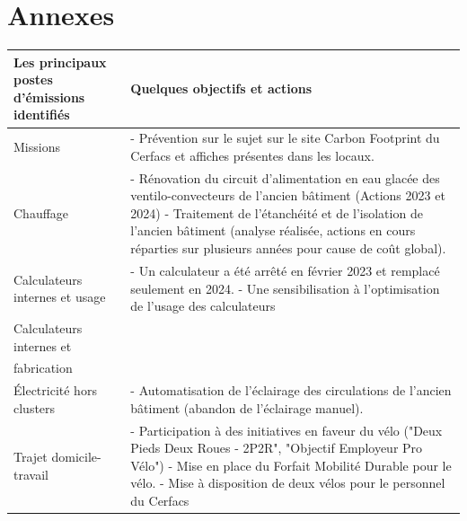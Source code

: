 \section*{Annexes}





\begin{table}[ht]
    \centering
    \begin{tabular}{|p{}|p{}|}
    \hline
    \textbf{Les principaux postes d’émissions identifiés} & \textbf{Quelques objectifs et actions} \\
    \hline
    Missions & 
    - Prévention sur le sujet sur le site Carbon Footprint du Cerfacs et affiches présentes dans les locaux. \\
    \hline
    Chauffage & 
    - Rénovation du circuit d’alimentation en eau glacée des ventilo-convecteurs de l’ancien bâtiment (Actions 2023 et 2024) \newline
    - Traitement de l’étanchéité et de l’isolation de l’ancien bâtiment (analyse réalisée, actions en cours réparties sur plusieurs années pour cause de coût global). \\
    \hline
    Calculateurs internes et usage & 
    - Un calculateur a été arrêté en février 2023 et remplacé seulement en 2024. \newline
    - Une sensibilisation à l’optimisation de l’usage des calculateurs \\
    \hline
    Calculateurs internes et \\fabrication & 
    \phantom{-}
    \phantom{-}\\
    \hline
    Électricité hors clusters & 
    - Automatisation de l’éclairage des circulations de l’ancien bâtiment (abandon de l’éclairage manuel). \\
    \hline
    Trajet domicile-travail & 
    - Participation à des initiatives en faveur du vélo ("Deux Pieds Deux Roues - 2P2R", "Objectif Employeur Pro Vélo") \newline
    - Mise en place du Forfait Mobilité Durable pour le vélo. \newline
    - Mise à disposition de deux vélos pour le personnel du Cerfacs \\

\end{tabular}
\end{table}
